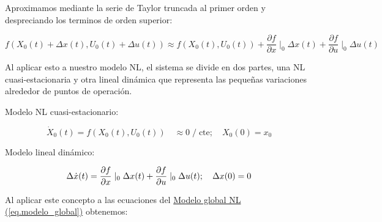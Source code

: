 \documentclass{article}
\begin{document}
Aproximamos mediante la serie de Taylor truncada al primer orden y despreciando los terminos
de orden superior:

\begin{equation}
    f(X_{0}(t) + \Delta x(t), U_{0}(t) + \Delta u (t)) \approx f(X_{0}(t), U_{0}(t)) + \frac{\partial f}{\partial x}\mid_{0}\Delta x(t) + \frac{\partial f}{\partial u}\mid_{0}\Delta u(t)
\end{equation}

Al aplicar esto a nuestro modelo NL, el sistema se divide en dos partes, una NL cuasi-estacionaria y otra 
lineal dinámica que representa las pequeñas variaciones alrededor de puntos de operación.

Modelo NL cuasi-estacionario:

\begin{equation}
    \dot{X}_{0}(t) = f(X_{0}(t), U_{0}(t)) \quad \approx 0 \;/\; \text{cte}; \quad X_{0}(0) = x_{0}
\end{equation}

Modelo lineal dinámico:

\begin{equation}
    \Delta\dot{x}(t) = \frac{\partial f}{\partial x}\mid_{0}\Delta x(t) + \frac{\partial f}{\partial u}\mid_{0}\Delta u(t); \quad \Delta x(0) = 0\\
\end{equation}

Al aplicar este concepto a las ecuaciones del
\hyperref[eq.modelo_global]{Modelo global NL (\ref*{eq.modelo_global})}
obtenemos:
\end{document}
